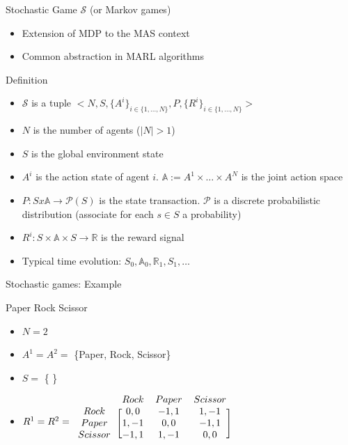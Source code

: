 \documentclass[presentation]{beamer}\mode<presentation>{\usetheme{AMSBolognaFC}}
\begin{document}
\begin{frame}[c]{Stochastic Game $\mathcal{S}$ (or Markov games)}
	\begin{alertblock}{}
		\begin{itemize}
			\item Extension of MDP to the MAS context
			\item Common abstraction in MARL algorithms
		\end{itemize}
	\end{alertblock}
	\begin{alertblock}{Definition}
		\begin{itemize}
			\item $\mathcal{S}$ is a tuple $<N, S, \{A^i\}_{i \in \{ 1, \dots, N\}}, P, \{R^i\}_{i \in \{ 1, \dots, N\}}>$
			\item $N$ is the number of agents ($|N| > 1 $)
			\item $S$ is the global environment state
			\item $A^i$ is the action state of agent $i$. $\mathbb{A} := A^1 \times \dots\times A^N$ is the joint action space
			\item $P: S x \mathbb{A} \rightarrow \mathcal{P}(S)$ is the state transaction. $\mathcal{P}$ is a discrete probabilistic distribution (associate for each $s \in S$ a probability)
			\item $R^i: S \times \mathbb{A} \times S \rightarrow \mathbb{R}$ is the reward signal
			\item Typical time evolution: $ S_0, \mathbb{A}_0, \mathbb{R}_1, S_1, \dots  $
		\end{itemize}
	\end{alertblock}
\end{frame}
\begin{frame}[fragile]{Stochastic games: Example}
	\begin{exampleblock}{Paper Rock Scissor}
		\begin{itemize}
			\item $N = 2$
			\item $A^1 = A^2 = $ \{Paper, Rock, Scissor\}
			\item $S = $ \{ \}
			\item $R^1 = R^2 = \begin{blockarray}{cccc}
        & Rock & Paper & Scissor \\
      \begin{block}{c[ccc]}
        Rock    & 0, 0  & -1, 1 & 1, -1 \\
        Paper   & 1, -1 & 0, 0  & -1, 1 \\
        Scissor & -1, 1 & 1, -1 & 0, 0 \\
      \end{block}
    \end{blockarray}$
		\end{itemize}
	\end{exampleblock}
\end{frame}
\end{document}
